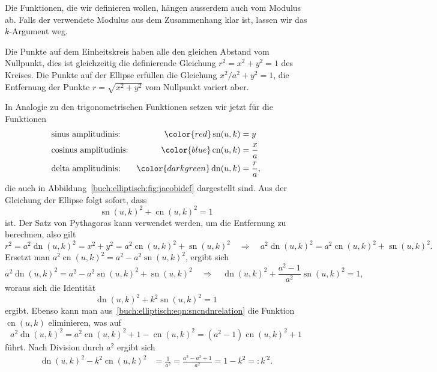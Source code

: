 Die Funktionen, die wir definieren wollen, hängen ausserdem auch 
vom Modulus ab.
Falls der verwendete Modulus aus dem Zusammenhang klar ist, lassen
wir das $k$-Argument weg.

Die Punkte auf dem Einheitskreis haben alle den gleichen Abstand vom
Nullpunkt, dies ist gleichzeitig die definierende Gleichung $r^2=x^2+y^2=1$
des Kreises.
Die Punkte auf der Ellipse erfüllen die Gleichung $x^2/a^2+y^2=1$,
die Entfernung der Punkte $r=\sqrt{x^2+y^2}$ vom Nullpunkt variert aber.

In Analogie zu den trigonometrischen Funktionen setzen wir jetzt für 
die Funktionen
\[
\begin{aligned}
&\text{sinus amplitudinis:}&
{\color{red}\operatorname{sn}(u,k)}&= y \\
&\text{cosinus amplitudinis:}&
{\color{blue}\operatorname{cn}(u,k)}&= \frac{x}{a} \\
&\text{delta amplitudinis:}&
{\color{darkgreen}\operatorname{dn}(u,k)}&=\frac{r}{a},
\end{aligned}
\]
die auch in Abbildung~\ref{buch:elliptisch:fig:jacobidef}
dargestellt sind.
Aus der Gleichung der Ellipse folgt sofort, dass
\[
\operatorname{sn}(u,k)^2 + \operatorname{cn}(u,k)^2 = 1
\]
ist.
Der Satz von Pythagoras kann verwendet werden, um die Entfernung zu
berechnen, also gilt
\begin{equation}
r^2
=
a^2 \operatorname{dn}(u,k)^2
=
x^2 + y^2
=
a^2\operatorname{cn}(u,k)^2 + \operatorname{sn}(u,k)^2
\quad
\Rightarrow
\quad
a^2 \operatorname{dn}(u,k)^2
=
a^2\operatorname{cn}(u,k)^2 + \operatorname{sn}(u,k)^2.
\label{buch:elliptisch:eqn:sncndnrelation}
\end{equation}
Ersetzt man
$
a^2\operatorname{cn}(u,k)^2
=
a^2-a^2\operatorname{sn}(u,k)^2
$, ergibt sich
\[
a^2 \operatorname{dn}(u,k)^2
=
a^2-a^2\operatorname{sn}(u,k)^2
+
\operatorname{sn}(u,k)^2
\quad
\Rightarrow
\quad
\operatorname{dn}(u,k)^2
+
\frac{a^2-1}{a^2}\operatorname{sn}(u,k)^2
=
1,
\]
woraus sich die Identität
\[
\operatorname{dn}(u,k)^2 + k^2 \operatorname{sn}(u,k)^2 = 1
\]
ergibt.
Ebenso kann man aus~\eqref{buch:elliptisch:eqn:sncndnrelation}
die Funktion $\operatorname{cn}(u,k)$ eliminieren, was auf
\[
a^2\operatorname{dn}(u,k)^2
=
a^2\operatorname{cn}(u,k)^2
+1-\operatorname{cn}(u,k)^2
=
(a^2-1)\operatorname{cn}(u,k)^2
+1
\]
führt.
Nach Division durch $a^2$ ergibt sich
\begin{align*}
\operatorname{dn}(u,k)^2
-
k^2\operatorname{cn}(u,k)^2
&=
\frac{1}{a^2}
=
\frac{a^2-a^2+1}{a^2}
=
1-k^2 =: k^{\prime 2}.
\end{align*}
